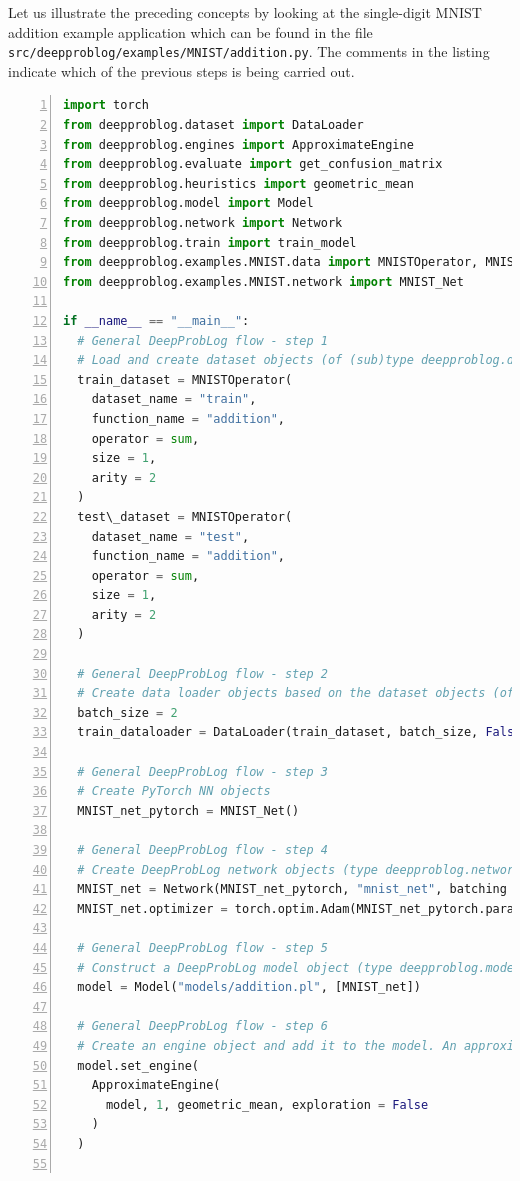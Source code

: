 Let us illustrate the preceding concepts by looking at the single-digit MNIST addition example application which can be found in the file \\\texttt{src/deepproblog/examples/MNIST/addition.py}. The comments in the listing indicate which of the previous steps is being carried out.
\begin{lstlisting}[language=Python, caption={src/deepproblog/examples/MNIST/basic\_addition.py, the basic MNIST single-digit addition example}, numbers=left, label={lst:MNIST_addition_source_code}, captionpos=b]
import torch
from deepproblog.dataset import DataLoader
from deepproblog.engines import ApproximateEngine
from deepproblog.evaluate import get_confusion_matrix
from deepproblog.heuristics import geometric_mean
from deepproblog.model import Model
from deepproblog.network import Network
from deepproblog.train import train_model
from deepproblog.examples.MNIST.data import MNISTOperator, MNIST_train, MNIST_test
from deepproblog.examples.MNIST.network import MNIST_Net
  
if __name__ == "__main__":
  # General DeepProbLog flow - step 1
  # Load and create dataset objects (of (sub)type deepproblog.dataset.Dataset)
  train_dataset = MNISTOperator(
    dataset_name = "train",
    function_name = "addition",
    operator = sum,
    size = 1,
    arity = 2
  )
  test\_dataset = MNISTOperator(
    dataset_name = "test",
    function_name = "addition",
    operator = sum,
    size = 1,
    arity = 2
  )
  
  # General DeepProbLog flow - step 2
  # Create data loader objects based on the dataset objects (of (sub)type deepproblog.dataset.DataLoader)
  batch_size = 2
  train_dataloader = DataLoader(train_dataset, batch_size, False)
  
  # General DeepProbLog flow - step 3
  # Create PyTorch NN objects
  MNIST_net_pytorch = MNIST_Net()
  
  # General DeepProbLog flow - step 4
  # Create DeepProbLog network objects (type deepproblog.network.Network) based on the PyTorch NNs
  MNIST_net = Network(MNIST_net_pytorch, "mnist_net", batching = True)
  MNIST_net.optimizer = torch.optim.Adam(MNIST_net_pytorch.parameters(), lr = 1e-3)
  
  # General DeepProbLog flow - step 5
  # Construct a DeepProbLog model object (type deepproblog.model.Model) based on the KB file and the DeepProbLog Network objects
  model = Model("models/addition.pl", [MNIST_net])
  
  # General DeepProbLog flow - step 6
  # Create an engine object and add it to the model. An approximate (class deepproblog.engines.ApproximateEngine) and exact (deepproblog.engines.ExactEngine) inference engine are provided in the standard DeepProbLog distribution. Both engines have cases in which they are or are not appropriate.
  model.set_engine(
    ApproximateEngine(
      model, 1, geometric_mean, exploration = False
    )
  )
  

\end{lstlisting}
